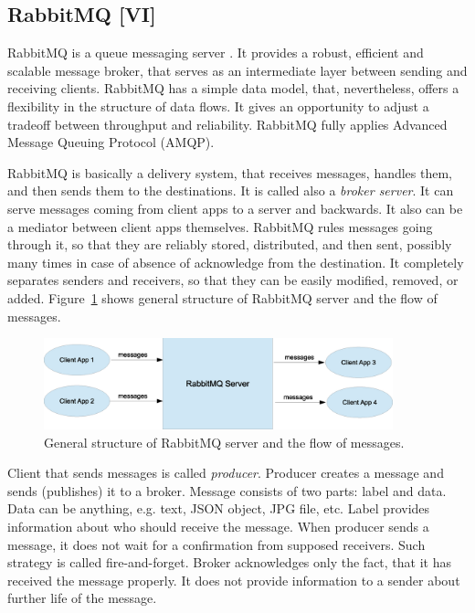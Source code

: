 \subsection{RabbitMQ [VI]}

RabbitMQ is a queue messaging server \cite{RabbitMQ, AlvaroWilliams2012}.
It provides a robust, efficient and scalable message broker, that serves as an intermediate layer between sending and receiving clients.
RabbitMQ has a simple data model, that, nevertheless, offers a flexibility in the structure of data flows.
It gives an opportunity to adjust a tradeoff between throughput and reliability.
RabbitMQ fully applies Advanced Message Queuing Protocol (AMQP).

RabbitMQ is basically a delivery system, that receives messages, handles them, and then sends them to the destinations.
It is called also a \textit{broker server}.
It can serve messages coming from client apps to a server and backwards.
It also can be a mediator between client apps themselves.
RabbitMQ rules messages going through it, so that they are reliably stored, distributed, and then sent, possibly many times in case of absence of acknowledge from the destination.
It completely separates senders and receivers, so that they can be easily modified, removed, or added.
Figure~\ref{fig:RabbitMQGeneralStructure} shows general structure of RabbitMQ server and the flow of messages.

\begin{figure}[h]
  \centering
  \includegraphics [width=0.9\textwidth]{images/RabbitMQGeneralStructure}
  \caption{General structure of RabbitMQ server and the flow of messages.}
  \label{fig:RabbitMQGeneralStructure}
\end{figure}

Client that sends messages is called \textit{producer}.
Producer creates a message and sends (publishes) it to a broker.
Message consists of two parts: label and data.
Data can be anything, e.g. text, JSON object, JPG file, etc.
Label provides information about who should receive the message.
When producer sends a message, it does not wait for a confirmation from supposed receivers.
Such strategy is called fire-and-forget.
Broker acknowledges only the fact, that it has received the message properly.
It does not provide information to a sender about further life of the message. 

